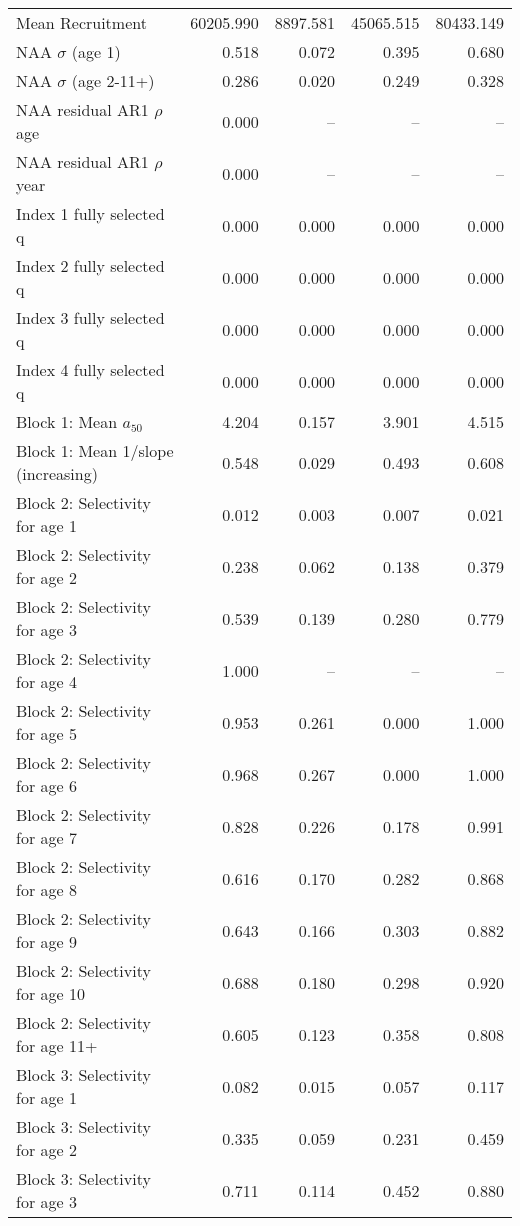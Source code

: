 \documentclass[
]{article}
\begin{document}
\begin{landscape}
\begin{longtable}[t]{lrrrr}
\endfoot
\bottomrule
\endlastfoot
Mean Recruitment & 60205.990 & 8897.581 & 45065.515 & 80433.149\\
NAA $\sigma$ (age 1) & 0.518 & 0.072 & 0.395 & 0.680\\
NAA $\sigma$ (age 2-11+) & 0.286 & 0.020 & 0.249 & 0.328\\
NAA residual AR1 $\rho$ age & 0.000 & -- & -- & --\\
NAA residual AR1 $\rho$ year & 0.000 & -- & -- & --\\
\addlinespace
Index 1 fully selected q & 0.000 & 0.000 & 0.000 & 0.000\\
Index 2 fully selected q & 0.000 & 0.000 & 0.000 & 0.000\\
Index 3 fully selected q & 0.000 & 0.000 & 0.000 & 0.000\\
Index 4 fully selected q & 0.000 & 0.000 & 0.000 & 0.000\\
Block 1: Mean $a_{50}$ & 4.204 & 0.157 & 3.901 & 4.515\\
\addlinespace
Block 1: Mean 1/slope (increasing) & 0.548 & 0.029 & 0.493 & 0.608\\
Block 2: Selectivity for age 1 & 0.012 & 0.003 & 0.007 & 0.021\\
Block 2: Selectivity for age 2 & 0.238 & 0.062 & 0.138 & 0.379\\
Block 2: Selectivity for age 3 & 0.539 & 0.139 & 0.280 & 0.779\\
Block 2: Selectivity for age 4 & 1.000 & -- & -- & --\\
\addlinespace
Block 2: Selectivity for age 5 & 0.953 & 0.261 & 0.000 & 1.000\\
Block 2: Selectivity for age 6 & 0.968 & 0.267 & 0.000 & 1.000\\
Block 2: Selectivity for age 7 & 0.828 & 0.226 & 0.178 & 0.991\\
Block 2: Selectivity for age 8 & 0.616 & 0.170 & 0.282 & 0.868\\
Block 2: Selectivity for age 9 & 0.643 & 0.166 & 0.303 & 0.882\\
\addlinespace
Block 2: Selectivity for age 10 & 0.688 & 0.180 & 0.298 & 0.920\\
Block 2: Selectivity for age 11+ & 0.605 & 0.123 & 0.358 & 0.808\\
Block 3: Selectivity for age 1 & 0.082 & 0.015 & 0.057 & 0.117\\
Block 3: Selectivity for age 2 & 0.335 & 0.059 & 0.231 & 0.459\\
Block 3: Selectivity for age 3 & 0.711 & 0.114 & 0.452 & 0.880\\

\end{longtable}
\end{landscape}
\end{document}
